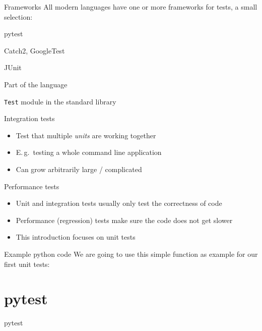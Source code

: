 \documentclass[
  aspectratio=1610,
]{beamer}
\newcommand\headlineframe[1]{%
  \begin{frame}[c]%
    \begin{center}%
      \Huge\color{vertexDarkRed}#1%
    \end{center}%
  \end{frame}%
}%
\begin{document}
\begin{frame}[c]{Frameworks}
  All modern languages have one or more frameworks for tests, a small selection:

  \begin{description}[Python]
    \item[Python] pytest
    \item[C++] Catch2, GoogleTest
    \item[Java] JUnit
    \item[Rust] Part of the language
    \item[Julia] \texttt{Test} module in the standard library
  \end{description}
\end{frame}

\begin{frame}[c]{Integration tests}
  \begin{itemize}
    \item Test that multiple \emph{units} are working together
    \item E.\,g.\ testing a whole command line application
    \item Can grow arbitrarily large / complicated
  \end{itemize}
\end{frame}

\begin{frame}[c]{Performance tests}
  \begin{itemize}
    \item Unit and integration tests usually only test the correctness of code
    \item Performance (regression) tests make sure the code does not get slower
    \item This introduction focuses on unit tests
  \end{itemize}
\end{frame}

\begin{frame}[c, fragile]{Example python code}
  We are going to use this simple function as example for our first unit tests:
\end{frame}

\section{pytest}
\headlineframe{pytest}
\end{document}
